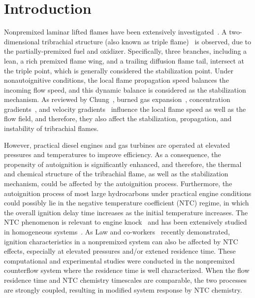 \documentclass{wssci}
\begin{document}

\section{Introduction}

Nonpremixed laminar lifted flames have been extensively investigated~\cite{chung07}. A two-dimensional tribrachial structure (also known as triple flame)~\cite{buckmaster02} is observed, due to the partially-premixed fuel and oxidizer.  Specifically, three branches, including a lean, a rich premixed flame wing, and a trailing diffusion flame tail, intersect at the triple point, which is generally considered the stabilization point.  Under nonautoignitive conditions, the local flame propagation speed balances the incoming flow speed, and this dynamic balance is considered as the stabilization mechanism.  As reviewed by Chung~\cite{chung07}, burned gas expansion~\cite{ruetsch95,lee97,plessing98,kioni99}, concentration gradients~\cite{dold89,hartley91,ghosal00}, and velocity gradients~\cite{kim07} influence the local flame speed as well as the flow field, and therefore, they also affect the stabilization, propagation, and instability of tribrachial flames.

However, practical diesel engines and gas turbines are operated at elevated pressures and temperatures to improve efficiency.  As a consequence, the propensity of autoignition is significantly enhanced, and therefore, the thermal and chemical structure of the tribrachial flame, as well as the stabilization mechanism, could be affected by the autoignition process.  Furthermore, the autoignition process of most large hydrocarbons under practical engine conditions could possibly lie in the negative temperature coefficient (NTC) regime, in which the overall ignition delay time increases as the initial temperature increases.  The NTC phenomenon is relevant to engine knock~\cite{battin-leclerc08} and has been extensively studied in homogeneous systems~\cite{zador11}.  As Law and co-workers~\cite{law12,zhao13,deng14} recently demonstrated, ignition characteristics in a nonpremixed system can also be affected by NTC effects, especially at elevated pressures and/or extened residence time.  These computational and experimental studies were conducted in the nonpremixed counterflow system where the residence time is well characterized.  When the flow residence time and NTC chemistry timescales are comparable, the two processes are strongly coupled, resulting in modified system response by NTC chemistry.
\end{document}
